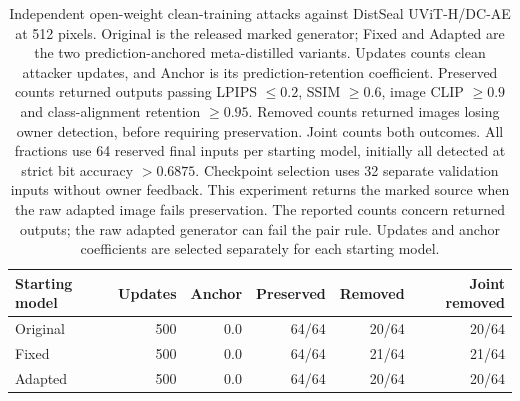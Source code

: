 \begin{table}[ht]\centering\small
\begin{tabular}{lrrrrr}\toprule
Starting model & Updates & Anchor & Preserved & Removed & Joint removed\\\midrule
Original & 500 & 0.0 & 64/64 & 20/64 & 20/64\\
Fixed & 500 & 0.0 & 64/64 & 21/64 & 21/64\\
Adapted & 500 & 0.0 & 64/64 & 20/64 & 20/64\\
\bottomrule\end{tabular}
\caption{Independent open-weight clean-training attacks against DistSeal UViT-H/DC-AE at 512 pixels. Original is the released marked generator; Fixed and Adapted are the two prediction-anchored meta-distilled variants. Updates counts clean attacker updates, and Anchor is its prediction-retention coefficient. Preserved counts returned outputs passing LPIPS $\leq0.2$, SSIM $\geq0.6$, image CLIP $\geq0.9$ and class-alignment retention $\geq0.95$. Removed counts returned images losing owner detection, before requiring preservation. Joint counts both outcomes. All fractions use 64 reserved final inputs per starting model, initially all detected at strict bit accuracy $>0.6875$. Checkpoint selection uses 32 separate validation inputs without owner feedback. This experiment returns the marked source when the raw adapted image fails preservation. The reported counts concern returned outputs; the raw adapted generator can fail the pair rule. Updates and anchor coefficients are selected separately for each starting model.}\end{table}
